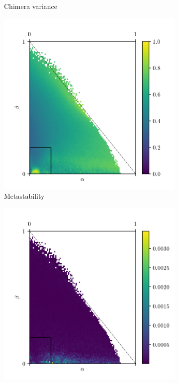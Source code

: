 \begin{figure}[ht!]
\begin{subfigure}{0.3\textwidth}
    \caption{Chimera variance}
    \label{fig:chimera_var}
  \end{subfigure}%
  \begin{subfigure}{0.3\textwidth}
    \centering
    \includegraphics[width=\textwidth]{figure/meta}
    \caption{Metastability}
    \label{fig:meta}
  \end{subfigure}
  \begin{subfigure}{0.3\textwidth}
    \centering
    \includegraphics[width=\textwidth]{figure/meta_var}

\end{subfigure}
\end{figure}
